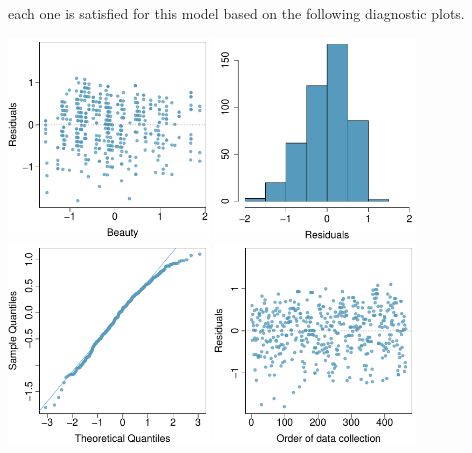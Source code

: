 {\begin{parts}
each one is satisfied for this model based on the following 
diagnostic plots.
\begin{center}
\includegraphics[width=0.4\textwidth]{ch_regr_simple_linear/figures/eoce/full_lin_regr_2/rate_my_prof_residuals.pdf}
\includegraphics[width=0.4\textwidth]{ch_regr_simple_linear/figures/eoce/full_lin_regr_2/rate_my_prof_residuals_hist.pdf} \\
\includegraphics[width=0.4\textwidth]{ch_regr_simple_linear/figures/eoce/full_lin_regr_2/rate_my_prof_residuals_qq.pdf}
\includegraphics[width=0.4\textwidth]{ch_regr_simple_linear/figures/eoce/full_lin_regr_2/rate_my_prof_residuals_order.pdf}
\end{center}
\end{parts}
}{}
